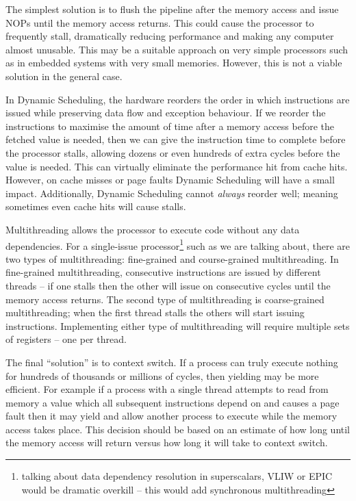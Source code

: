 \documentclass[10pt,\jkfside,a4paper]{article}
\begin{document}
\begin{enumerate}
\begin{itemize}
The simplest solution is to flush the pipeline after the memory access and
issue NOPs until the memory access returns. This could cause the processor
to frequently stall, dramatically reducing performance and making any
computer almost unusable. This may be a suitable approach on very simple
processors such as in embedded systems with very small memories. However,
this is not a viable solution in the general case.

In Dynamic Scheduling, the hardware reorders the order in which instructions
are issued while preserving data flow and exception behaviour. If we reorder
the instructions to maximise the amount of time after a memory access before
the fetched value is needed, then we can give the instruction time to complete
before the processor stalls, allowing dozens or even hundreds of extra cycles
before the value is needed. This can virtually eliminate the performance hit
from cache hits. However, on cache misses or page faults Dynamic Scheduling
will have a small impact. Additionally, Dynamic Scheduling cannot
\textit{always} reorder well; meaning sometimes even cache hits will cause
stalls.

Multithreading allows the processor to execute code without any data
dependencies. For a single-issue processor\footnote{talking about data
dependency resolution in superscalars, VLIW or EPIC would be dramatic
overkill -- this would add synchronous multithreading} such as we are
talking about, there are two types of multithreading: fine-grained and
course-grained multithreading. In fine-grained multithreading, consecutive
instructions are issued by different threads -- if one stalls then the other
will issue on consecutive cycles until the memory access returns. The second
type of multithreading is coarse-grained multithreading; when the first
thread stalls the others will start issuing instructions. Implementing
either type of multithreading will require multiple sets of registers -- one
per thread.

The final ``solution'' is to context switch. If a process can truly execute
nothing for hundreds of thousands or millions of cycles, then yielding may
be more efficient. For example if a process with a single thread attempts to
read from memory a value which all subsequent instructions depend on and causes
a page fault then it may yield and allow another process to execute while
the memory access takes place. This decision should be based on an estimate
of how long until the memory access will return versus how long it will take
to context switch.


\end{itemize}
\end{enumerate}
\end{document}
